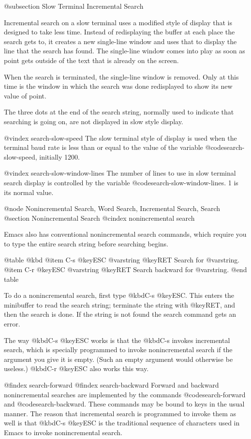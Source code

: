 {{{{{{{{@subsection Slow Terminal Incremental Search

  Incremental search on a slow terminal uses a modified style of display
that is designed to take less time.  Instead of redisplaying the buffer at
each place the search gets to, it creates a new single-line window and uses
that to display the line that the search has found.  The single-line window
comes into play as soon as point gets outside of the text that is already
on the screen.

  When the search is terminated, the single-line window is removed.  Only
at this time is the window in which the search was done redisplayed to show
its new value of point.

  The three dots at the end of the search string, normally used to indicate
that searching is going on, are not displayed in slow style display.

@vindex search-slow-speed
  The slow terminal style of display is used when the terminal baud rate is
less than or equal to the value of the variable @code{search-slow-speed},
initially 1200.

@vindex search-slow-window-lines
  The number of lines to use in slow terminal search display is controlled
by the variable @code{search-slow-window-lines}.  1 is its normal value.

@node Nonincremental Search, Word Search, Incremental Search, Search
@section Nonincremental Search
@cindex nonincremental search

  Emacs also has conventional nonincremental search commands, which require
you to type the entire search string before searching begins.

@table @kbd
@item C-s @key{ESC} @var{string} @key{RET}
Search for @var{string}.
@item C-r @key{ESC} @var{string} @key{RET}
Search backward for @var{string}.
@end table

  To do a nonincremental search, first type @kbd{C-s @key{ESC}}.  This
enters the minibuffer to read the search string; terminate the string with
@key{RET}, and then the search is done.  If the string is not found the
search command gets an error.

  The way @kbd{C-s @key{ESC}} works is that the @kbd{C-s} invokes
incremental search, which is specially programmed to invoke nonincremental
search if the argument you give it is empty.  (Such an empty argument would
otherwise be useless.)  @kbd{C-r @key{ESC}} also works this way.

@findex search-forward
@findex search-backward
  Forward and backward nonincremental searches are implemented by the
commands @code{search-forward} and @code{search-backward}.  These commands
may be bound to keys in the usual manner.  The reason that incremental
search is programmed to invoke them as well is that @kbd{C-s @key{ESC}}
is the traditional sequence of characters used in Emacs to invoke
nonincremental search.

}}}}}}}}
